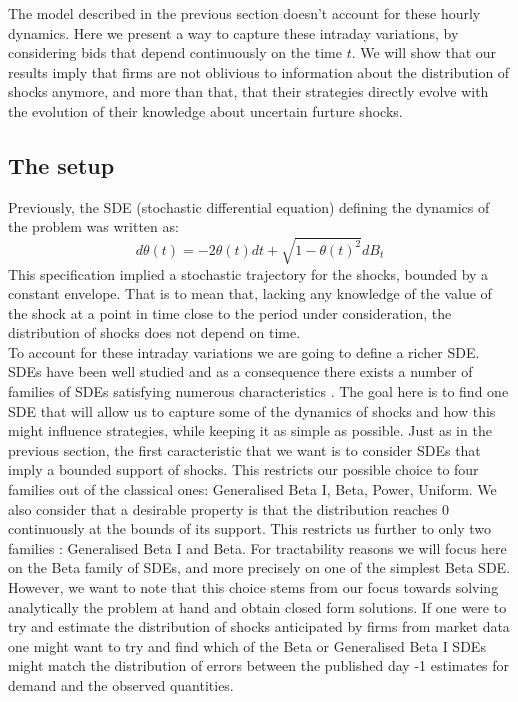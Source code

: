 The model described in the previous section doesn't account for these hourly dynamics. Here we present a way to capture these intraday variations, by considering bids that depend continuously on the time $t$. We will show that our results imply that firms are not oblivious to information about the distribution of shocks anymore, and more than that, that their strategies directly evolve with the evolution of their knowledge about uncertain furture shocks.\\


\subsection{The setup}\label{setupdyn}
Previously, the SDE (stochastic differential equation) defining the dynamics of the problem was written as: 
$$d\theta(t)=-2\theta(t) dt+\sqrt{1-\theta(t)^2}dB_t$$ 
This specification implied a stochastic trajectory for the shocks, bounded by a constant envelope. That is to mean that, lacking any knowledge of the value of the shock at a point in time close to the period under consideration, the distribution of shocks does not depend on time.\\

To account for these intraday variations we are going to define a richer SDE. \\

SDEs have been well studied and as a consequence there exists a number of families of SDEs satisfying numerous characteristics \cite{enveloppe}. The goal here is to find one SDE that will allow us to capture some of the dynamics of shocks and how this might influence strategies, while keeping it as simple as possible. Just as in the previous section, the first caracteristic that we want is to consider SDEs that imply a bounded support of shocks. This restricts our possible choice to four families out of the classical ones: Generalised Beta I, Beta, Power, Uniform. We also consider that a desirable property is that the distribution reaches 0 continuously at the bounds of its support. This restricts us further to only two families : Generalised Beta I and Beta. For tractability reasons we will focus here on the Beta family of SDEs, and more precisely on one of the simplest Beta SDE. However, we want to note that this choice stems from our focus towards solving analytically the problem at hand and obtain closed form solutions. If one were to try and estimate the distribution of shocks anticipated by firms from market data one might want to try and find which of the Beta or Generalised Beta I SDEs might match the distribution of errors between the published day -1 estimates for demand and the observed quantities.\\

